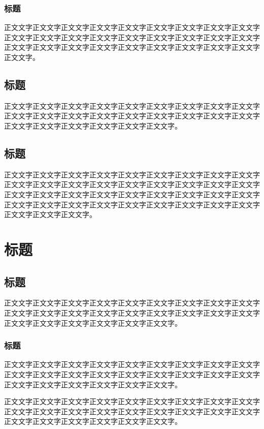 \documentclass[
	StudentName     = 孙敬垚,
	StudentNameEng	= {{Name of Graduate (such as HAN Bao-cheng)}},
	AdvisorName     = {{冯兴杰 教授}},
	AdvisorNameEng	= {{Name of Supervisor and Title (such as Prof. FENG Chang-gen)}},
        AdvisorNameEngSecond = {{Name of Second Supervisor and Title}},
	StudentID		= XXXXX,
	Major           = ,
	ResearchInterest= ,
	Department		= XXXX学院,
	DepartmentEng	= {{Name of Department (or School)}},
	SubmitYear		= 202X,
	SubmitMonth		= X,
	SubmitDay		= XX,
	DefenseYear		= 202X,
	DefenseMonth	= X,
	DefenseDay		= XX,
	DefenseDateEng	= {{Date of Submit (such as April 2002)}},
	Title           = I2TDM,
	TitleEng        = {{English Title}},
	CLCNumber		= TD235,
	UDCNumber		= 624.152.5
]{cauc_thesis}
\begin{document}
\subsection{标题}
正文文字正文文字正文文字正文文字正文文字正文文字正文文字正文文字正文文字正文文字正文文字正文文字正文文字正文文字正文文字正文文字正文文字正文文字正文文字正文文字正文文字正文文字正文文字正文文字正文文字正文文字正文文字正文文字。

\section{标题}
正文文字正文文字正文文字正文文字正文文字正文文字正文文字正文文字正文文字正文文字正文文字正文文字正文文字正文文字正文文字正文文字正文文字正文文字正文文字正文文字正文文字正文文字正文文字正文文字。

\section{标题}
正文文字正文文字正文文字正文文字正文文字正文文字正文文字正文文字正文文字正文文字正文文字正文文字正文文字正文文字正文文字正文文字正文文字正文文字正文文字正文文字正文文字正文文字正文文字正文文字正文文字正文文字正文文字正文文字正文文字正文文字正文文字正文文字正文文字正文文字正文文字正文文字正文文字正文文字正文文字。


{\centering\chapter{标题}}

\section{标题}
正文文字正文文字正文文字正文文字正文文字正文文字正文文字正文文字正文文字正文文字正文文字正文文字正文文字正文文字正文文字正文文字正文文字正文文字正文文字正文文字正文文字正文文字正文文字正文文字。

\subsection{标题}
正文文字正文文字正文文字正文文字正文文字正文文字正文文字正文文字正文文字正文文字正文文字正文文字正文文字正文文字正文文字正文文字正文文字正文文字正文文字正文文字正文文字正文文字正文文字正文文字。

正文文字正文文字正文文字正文文字正文文字正文文字正文文字正文文字正文文字正文文字正文文字正文文字正文文字正文文字正文文字正文文字正文文字正文文字正文文字正文文字正文文字正文文字正文文字正文文字。
\end{document}
